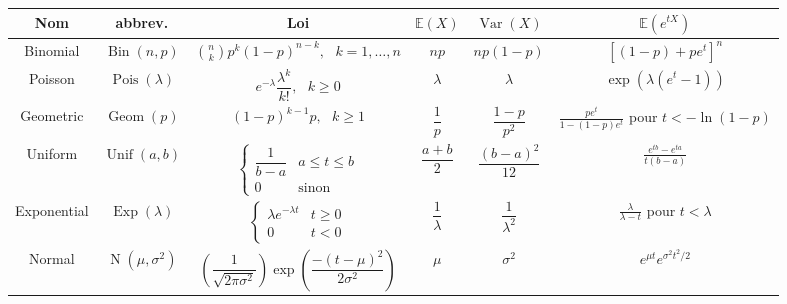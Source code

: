 \documentclass[11pt, addpoints, answers]{exam}
\def\Bin{\operatorname{Bin}}
\def\Var{\operatorname{Var}}
\def\Geom{\operatorname{Geom}}
\def\Pois{\operatorname{Pois}}
\def\Exp{\operatorname{Exp}}
\def\Unif{\operatorname{Unif}}
\def\No{\operatorname{N}}
\newcommand{\E}{\mathbb E}            %
\def\Var{\operatorname{Var}}
\begin{document}
\renewcommand\arraystretch{3.5}
\begin{table}[H]
\begin{center}
\footnotesize
\begin{tabular}{|c|c|c|c|c|c|}

\hline
Nom & abbrev. & Loi & $\E(X)$ & $\Var(X)$ & $\E\left(e^{tX}\right)$\\
\hline\hline
Binomial & $\Bin(n,p)$ & $\binom{n}{k}p^k(1-p)^{n-k},\text{ }k = 1,\ldots, n$ & $np$ & $np(1-p)$ & $[(1-p)+pe^t]^n$\\
\hline
Poisson & $\Pois(\lambda)$ & $e^{-\lambda}\dfrac{\lambda^k}{k!},\text{ }k\geq 0$ & $\lambda$ & $\lambda$ &$ \exp(\lambda(e^t-1))$\\
\hline
Geometric & $\Geom(p)$ & $(1-p)^{k-1}p,\text{ }k\geq 1$ & $\dfrac{1}{p}$ & $\dfrac{1-p}{p^2}$ & $\frac{pe^t}{1-(1-p)e^t}$ pour  $t<-\ln(1-p)$\\
\hline
Uniform & $\Unif(a,b)$ & $\begin{cases} \dfrac{1}{b-a} & a\leq t\leq b\\ 0 & \text{sinon}\end{cases}
$ & $\dfrac{a+b}{2}$ & $\dfrac{(b-a)^2}{12}$ & $\frac{e^{tb}-e^{ta}}{t(b-a)}$\\
\hline
Exponential & $\Exp(\lambda)$ & $\begin{cases} \lambda e^{-\lambda t} & t\geq 0 \\ 0 & t<0\end{cases}$ & $\dfrac{1}{\lambda}$ & $\dfrac{1}{\lambda^2}$ & $\frac{\lambda}{\lambda -t}$ pour $t<\lambda$\\
\hline
Normal & $\No(\mu,\sigma^2)$ & $\left(\dfrac{1}{\sqrt{2\pi\sigma^2}}\right)\operatorname{exp}{\left(\dfrac{-(t-\mu)^2}{2\sigma^2}\right)}$ & $\mu$ & $\sigma^2$ & $e^{\mu t}e^{\sigma^2t^2/2}$\\
\hline
\end{tabular}
\end{center}
\end{table}%
\end{document}
